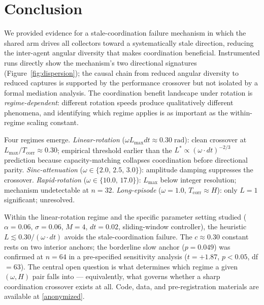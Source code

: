 \documentclass[sigconf,anonymous]{aamas}
\newcommand{\Lmax}{L_{\max}}
\newcommand{\Tcorr}{T_{\mathrm{corr}}}
\newcommand{\omdt}{\omega\!\cdot\!dt}
\begin{document}
\section{Conclusion}
\label{sec:conclusion}

We provided evidence for a stale-coordination failure mechanism in
which the shared arm drives all collectors toward a systematically stale
direction, reducing the inter-agent angular diversity that makes
coordination beneficial.  Instrumented runs directly show the
mechanism's two directional signatures (Figure~\ref{fig:dispersion});
the causal chain from reduced angular diversity to reduced captures
is supported by the performance crossover but not isolated by a formal
mediation analysis.  The coordination benefit landscape under
rotation is \emph{regime-dependent}: different rotation speeds produce
qualitatively different phenomena, and identifying which regime applies
is as important as the within-regime scaling constant.

Four regimes emerge.
\emph{Linear-rotation} ($\omega\Lmax dt{\approx}0.30\;\text{rad}$):
clean crossover at $\Lmax/\Tcorr{\approx}0.30$; empirical threshold
earlier than the $L^*{\propto}(\omdt)^{-2/3}$ prediction because
capacity-matching collapses coordination before directional parity.
\emph{Sinc-attenuation} ($\omega{\in}\{2.0,\,2.5,\,3.0\}$):
amplitude damping suppresses the crossover.
\emph{Rapid-rotation} ($\omega{\in}\{10.0,\,17.0\}$):
$\Lmax$ below integer resolution; mechanism undetectable at $n{=}32$.
\emph{Long-episode} ($\omega{=}1.0$, $\Tcorr{\approx}H$):
only $L{=}1$ significant; unresolved.

Within the linear-rotation regime and the specific parameter setting
studied ($\alpha{=}0.06$, $\sigma{=}0.06$, $M{=}4$, $dt{=}0.02$,
sliding-window controller), the heuristic $L \lesssim 0.30/(\omdt)$
avoids the stale-coordination failure.
The $c \approx 0.30$ constant rests on two interior anchors;
the borderline slow anchor ($p{=}0.049$) was confirmed at $n{=}64$
in a pre-specified sensitivity analysis ($t{=}{+}1.87$, $p{<}0.05$,
df${}={}63$).
The central open question is what determines which regime a given
$(\omega, H)$ pair falls into — equivalently, what governs whether a
sharp coordination crossover exists at all.
Code, data, and pre-registration materials are available at \url{[anonymized]}.



\end{document}
